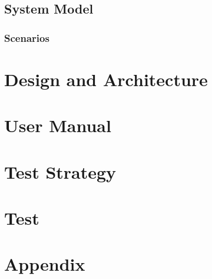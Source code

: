 \documentclass{report}
\begin{document}
\section{System Model}

\subsection{Scenarios}

\chapter{Design and Architecture}

\chapter{User Manual}

\chapter{Test Strategy}

\chapter{Test}

\chapter{Appendix}
\end{document}
